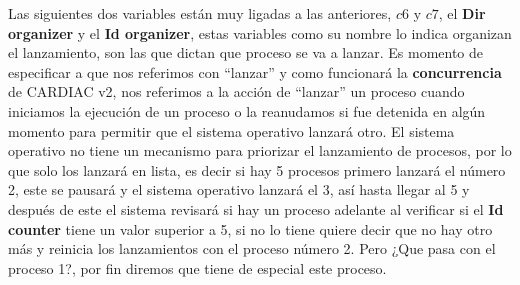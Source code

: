 \documentclass[12pt]{article}
\begin{document}
	Las siguientes dos variables están muy ligadas a las anteriores, $c6$ y $c7$, el \textbf{Dir organizer} y el \textbf{Id organizer},
	estas variables como su nombre lo indica organizan el lanzamiento, son las que dictan que proceso se va a lanzar. Es momento
	de especificar a que nos referimos con ``lanzar'' y como funcionará la \textbf{concurrencia} de CARDIAC v2, nos referimos
	a la acción de ``lanzar'' un proceso cuando iniciamos la ejecución de un proceso o la reanudamos si fue detenida en algún
	momento para permitir que el sistema operativo lanzará otro. El sistema operativo no tiene un mecanismo para priorizar
	el lanzamiento de procesos, por lo que solo los lanzará en lista, es decir si hay 5 procesos primero lanzará el número 2, este
	se pausará y el sistema operativo lanzará el 3, así hasta llegar al 5 y después de este el sistema revisará si hay un proceso
	adelante al verificar si el \textbf{Id counter} tiene un valor superior a 5, si no lo tiene quiere decir que no hay otro
	más y reinicia los lanzamientos con el proceso número 2. Pero ¿Que pasa con el proceso 1?, por fin diremos que tiene de especial
	este proceso.
	
\end{document}
